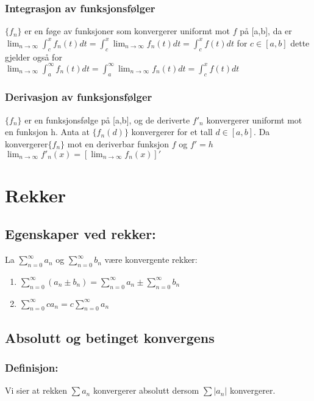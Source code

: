 \documentclass[8pt,a4paper,twocolumn,twoside]{article}
\def\abs#1{\lvert #1 \rvert}
\begin{document}
            \subsubsection*{Integrasjon av funksjonsfølger}
            $\{f_n\}$ er en føge av funksjoner som konvergerer uniformt mot $f$ på [a,b], da er $\lim_{n\to\infty}\int_c^x f_n(t)dt = \int_c^x\lim_{n\to\infty}f_n(t)dt=\int_c^xf(t)dt$
            for $c \in [a,b]$ dette gjelder også for\\ $\lim_{n\to\infty}\int_a^\infty f_n(t)dt = \int_a^\infty\lim_{n\to\infty}f_n(t)dt=\int_c^xf(t)dt$
            \subsubsection*{Derivasjon av funksjonsfølger}
            $\{f_n\}$ er en funksjonsfølge på [a,b], og de deriverte $f'_n$ konvergerer uniformt mot en funksjon h. Anta 
            at $\{f_n(d)\}$ konvergerer for et tall $d\in [a,b]$. Da konvergerer$\{f_n\}$ mot en deriverbar funksjon $f$ og $f'=h$\\
            $\lim_{n\to\infty}f'_n(x)=[\lim_{n\to\infty}f_n(x)]'$
            
    \section*{Rekker}
        \subsection*{Egenskaper ved rekker:}
        La $\sum_{n=0}^\infty a_n$ og $\sum_{n=0}^\infty b_n$ være konvergente rekker:
        \begin{enumerate}[topsep = 0pt,partopsep = 0pt, itemsep = 0cm]
            \item $\sum_{n=0}^\infty (a_n \pm b_n) = \sum_{n=0}^\infty a_n \pm \sum_{n=0}^\infty b_n$
            \item $\sum_{n=0}^\infty ca_n=c\sum_{n=0}^\infty a_n$
        \end{enumerate}
        \subsection*{Absolutt og betinget konvergens}
        \subsubsection*{Definisjon:} 
        Vi sier at rekken $\sum a_n$ konvergerer absolutt dersom $\sum\abs{a_n}$ konvergerer.
\end{document}
